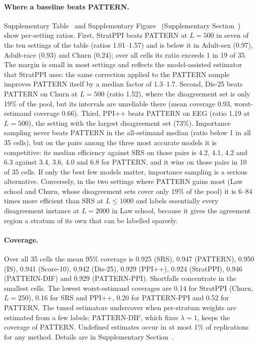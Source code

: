 \paragraph{Where a baseline beats PATTERN.} Supplementary Table~ and Supplementary Figure~ (Supplementary Section~) show per-setting ratios. First, StratPPI beats PATTERN at $L=500$ in seven of the ten settings of the table (ratios 1.01--1.57) and is below it in Adult-sex (0.97), Adult-race (0.93) and Churn (0.24); over all cells its ratio exceeds 1 in 19 of 35. The margin is small in most settings and reflects the model-assisted estimator that StratPPI uses: the same correction applied to the PATTERN sample improves PATTERN itself by a median factor of 1.3--1.7. Second, Dis-25 beats PATTERN on Churn at $L=500$ (ratio 1.52), where the disagreement set is only 19\% of the pool, but its intervals are unreliable there (mean coverage 0.93, worst-estimand coverage 0.66). Third, PPI++ beats PATTERN on EEG (ratio 1.19 at $L=500$), the setting with the largest disagreement set (73\%). Importance sampling never beats PATTERN in the all-estimand median (ratio below 1 in all 35 cells), but on the pairs among the three most accurate models it is competitive: its median efficiency against SRS on those pairs is 4.2, 4.1, 4.2 and 6.3 against 3.4, 3.6, 4.0 and 6.8 for PATTERN, and it wins on those pairs in 10 of 35 cells. If only the best few models matter, importance sampling is a serious alternative. Conversely, in the two settings where PATTERN gains most (Law school and Churn, whose disagreement sets cover only 19\% of the pool) it is 6--84 times more efficient than SRS at $L\le1000$ and labels essentially every disagreement instance at $L=2000$ in Law school, because it gives the agreement region a stratum of its own that can be labelled sparsely.

\paragraph{Coverage.} Over all 35 cells the mean 95\% coverage is 0.925 (SRS), 0.947 (PATTERN), 0.950 (IS), 0.941 (Score-10), 0.942 (Dis-25), 0.929 (PPI++), 0.924 (StratPPI), 0.946 (PATTERN-DIF) and 0.929 (PATTERN-PPI). Shortfalls concentrate in the smallest cells. The lowest worst-estimand coverages are 0.14 for StratPPI (Churn, $L=250$), 0.16 for SRS and PPI++, 0.20 for PATTERN-PPI and 0.52 for PATTERN. The tuned estimators undercover when per-stratum weights are estimated from a few labels; PATTERN-DIF, which fixes $\lambda=1$, keeps the coverage of PATTERN. Undefined estimates occur in at most 1\% of replications for any method. Details are in Supplementary Section~.

